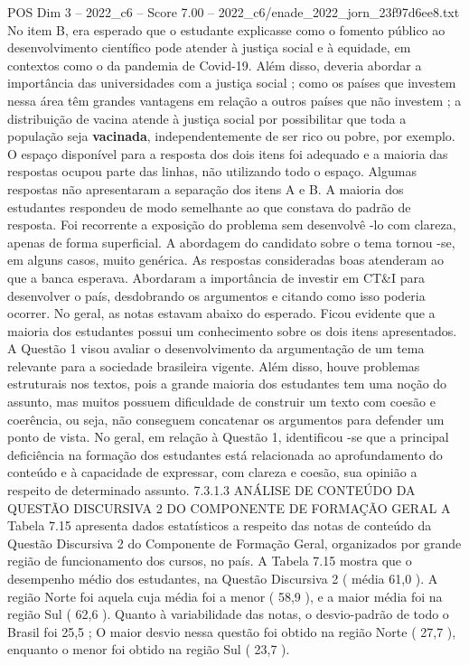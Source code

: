 \begin{textsample}{POS Dim 3 – 2022\_c6 – Score 7.00 – 2022\_c6/enade\_2022\_jorn\_23f97d6ee8.txt}
No item B, era esperado que o estudante explicasse como o fomento público ao desenvolvimento científico pode atender à justiça social e à equidade, em contextos como o da pandemia de Covid-19.
Além disso, deveria abordar a importância das universidades com a justiça social ; como os países que investem nessa área têm grandes vantagens em relação a outros países que não investem ; a distribuição de vacina atende à justiça social por possibilitar que toda a população seja \textbf{vacinada}, independentemente de ser rico ou pobre, por exemplo.
O espaço disponível para a resposta dos dois itens foi adequado e a maioria das respostas ocupou parte das linhas, não utilizando todo o espaço.
Algumas respostas não apresentaram a separação dos itens A e B.
A maioria dos estudantes respondeu de modo semelhante ao que constava do padrão de resposta.
Foi recorrente a exposição do problema sem desenvolvê -lo com clareza, apenas de forma superficial.
A abordagem do candidato sobre o tema tornou -se, em alguns casos, muito genérica.
As respostas consideradas boas atenderam ao que a banca esperava.
Abordaram a importância de investir em CT\&I para desenvolver o país, desdobrando os argumentos e citando como isso poderia ocorrer.
No geral, as notas estavam abaixo do esperado.
Ficou evidente que a maioria dos estudantes possui um conhecimento sobre os dois itens apresentados.
A Questão 1 visou avaliar o desenvolvimento da argumentação de um tema relevante para a sociedade brasileira vigente.
Além disso, houve problemas estruturais nos textos, pois a grande maioria dos estudantes tem uma noção do assunto, mas muitos possuem dificuldade de construir um texto com coesão e coerência, ou seja, não conseguem concatenar os argumentos para defender um ponto de vista.
No geral, em relação à Questão 1, identificou -se que a principal deficiência na formação dos estudantes está relacionada ao aprofundamento do conteúdo e à capacidade de expressar, com clareza e coesão, sua opinião a respeito de determinado assunto. 7.3.1.3 ANÁLISE DE CONTEÚDO DA QUESTÃO DISCURSIVA 2 DO COMPONENTE DE FORMAÇÃO GERAL A Tabela 7.15 apresenta dados estatísticos a respeito das notas de conteúdo da Questão Discursiva 2 do Componente de Formação Geral, organizados por grande região de funcionamento dos cursos, no país.
A Tabela 7.15 mostra que o desempenho médio dos estudantes, na Questão Discursiva 2 ( média 61,0 ).
A região Norte foi aquela cuja média foi a menor ( 58,9 ), e a maior média foi na região Sul ( 62,6 ).
Quanto à variabilidade das notas, o desvio-padrão de todo o Brasil foi 25,5 ; O maior desvio nessa questão foi obtido na região Norte ( 27,7 ), enquanto o menor foi obtido na região Sul ( 23,7 ).

\end{textsample}
